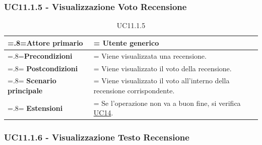         \subsubsection{UC11.1.5 - Visualizzazione Voto Recensione}
        \label{UC11.1.5}

            \begin{table}[H]
                \centering
                \renewcommand{\arraystretch}{1.8}
                \renewcommand\tabularxcolumn[1]{m{#1}}
                \begin{tabularx}{0.9\textwidth} {
                    >{\hsize=.8\hsize\linewidth=\hsize}X
                    >{\hsize=1.2\hsize\linewidth=\hsize}X}
                    \hline
                    \textbf{Attore primario} & Utente generico \\
                    \hline
                    \textbf{Precondizioni} & Viene visualizzata una recensione. \\
                    \hline
                    \textbf{Postcondizioni} & Viene visualizzato il voto della recensione. \\
                    \hline
                    \textbf{Scenario principale} & Viene visualizzato il voto all'interno della recensione corrispondente. \\
                    \hline
                    \textbf{Estensioni} & Se l'operazione non va a buon fine, si verifica \hyperref[UC14]{UC14}. \\
                    \hline
                \end{tabularx}
                \caption{UC11.1.5}
            \end{table}

        \subsubsection{UC11.1.6 - Visualizzazione Testo Recensione}
        \label{UC11.1.6}

